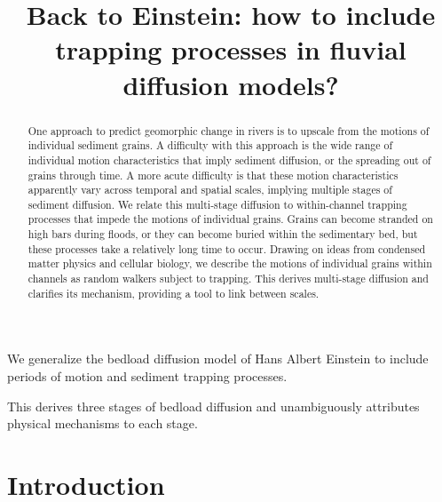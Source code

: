 \documentclass[]{agujournal2018}
\begin{document}
\title{Back to Einstein: how to include trapping processes in fluvial diffusion models?}


\begin{keypoints}
\item We generalize the bedload diffusion model of Hans Albert Einstein to include periods of motion and sediment trapping processes.
\item This derives three stages of bedload diffusion and unambiguously attributes physical mechanisms to each stage.
\end{keypoints}

\begin{abstract}
One approach to predict geomorphic change in rivers is to upscale from the motions of individual sediment grains. A difficulty with this approach is the wide range of individual motion characteristics that imply sediment diffusion, or the spreading out of grains through time. A more acute difficulty is that these motion characteristics apparently vary across temporal and spatial scales, implying multiple stages of sediment diffusion. We relate this multi-stage diffusion to within-channel trapping processes that impede the motions of individual grains. Grains can become stranded on high bars during floods, or they can become buried within the sedimentary bed, but these processes take a relatively long time to occur. Drawing on ideas from condensed matter physics and cellular biology, we describe the motions of individual grains within channels as random walkers subject to trapping. This derives multi-stage diffusion and clarifies its mechanism, providing a tool to link between scales.
\end{abstract}

\section{Introduction}

\end{document}
